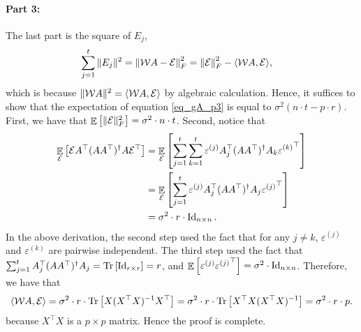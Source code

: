 	\paragraph{Part 3:} The last part is the square of $E_j$,
	\begin{align}\label{eq_gA_p3}
		\sum_{j=1}^t \|E_j\|^2 &= \left\| {\mathcal W} A - \mathcal{E} \right\|_{F}^2
		= \left\| \mathcal{E} \right\|_{F}^2 - \langle {\mathcal W} A, \mathcal{E} \rangle,
	\end{align}
	which is because $\|{\mathcal W} A\|^2 = \langle {\mathcal W} A, \mathcal{E} \rangle$ by algebraic calculation.
	Hence, it suffices to show that the expectation of equation \eqref{eq_gA_p3} is equal to $\sigma^2 (n\cdot t - p\cdot r)$.
	First, we have that $\mathop{\mathbb{E}}\left[ \|\mathcal{E}\|_F^2 \right] = \sigma^2 \cdot n \cdot t$.
	Second, notice that
	\begin{align*}
			\mathop{\mathbb{E}}_{\mathcal{E}}\left[ \mathcal{E} A^{\top} (AA^{\top})^{\dagger} A \mathcal{E}^{\top} \right]
		&= \mathop{\mathbb{E}}_{\mathcal{E}}\left[ \sum_{j=1}^t \sum_{k=1}^t \varepsilon^{(j)} A_j^{\top} (AA^{\top})^{\dagger} A_k {\varepsilon^{(k)}}^{\top} \right] \\
		&= \mathop{\mathbb{E}}_{\mathcal{E}}\left[ \sum_{j=1}^t \varepsilon^{(j)} A_j^{\top} (AA^{\top})^{\dagger} A_j {\varepsilon^{(j)}}^{\top} \right] \\
		&= \sigma^2 \cdot r \cdot \operatorname{Id}_{n\times n}.
	\end{align*}
	In the above derivation, the second step used the fact that for any $j\neq k$, $\varepsilon^{(j)}$ and $\varepsilon^{(k)}$ are pairwise independent.
	The third step used the fact that $\sum_{j=1}^t A_j^{\top} (AA^{\top})^{\dagger} A_j = \operatorname{Tr}\left[\operatorname{Id}_{r\times r}\right] = r$, and $\mathop{\mathbb{E}}\left[ \varepsilon^{(j)} {\varepsilon^{(j)}}^{\top} \right] = \sigma^2 \cdot \operatorname{Id}_{n\times n}$.
	Therefore, we have that
	\begin{align*}
		\langle {\mathcal W} A, \mathcal{E} \rangle = \sigma^2 \cdot r \cdot \operatorname{Tr}\left[X(X^{\top} X)^{-1} X^{\top}\right] =  \sigma^2 \cdot r \cdot \operatorname{Tr}\left[ X^{\top}X(X^{\top} X)^{-1}\right]  = \sigma^2 \cdot r \cdot p.
	\end{align*}
   because $X^\top X$ is a $p\times p$ matrix.	
	Hence the proof is complete.

